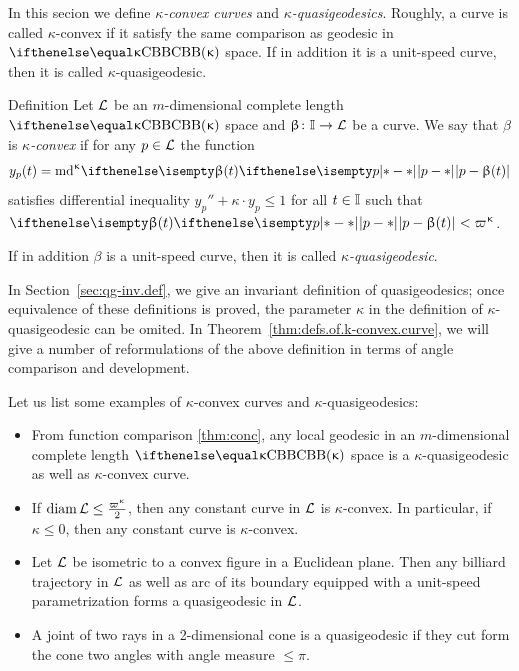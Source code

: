 In this secion we define \emph{$\kappa$-convex curves} and \emph{$\kappa$-quasigeodesics}.
Roughly, a curve is called $\kappa$-convex if it satisfy the same comparison as geodesic in $\Alex\kappa$ space.
If in addition it is a unit-speed curve, then it is called $\kappa$-quasigeodesic.

\begin{thm}{Definition}\label{def:k-convex.curve}
Let 
$\mathcal{L}$ be an $m$-dimensional complete length $\Alex\kappa$ space
and $\beta\:\II\to \spc{L}$ be a curve.
We say that $\beta$ is \emph{$\kappa$-convex} if for any $p\in \spc{L}$ the function
\[y_p(t)=\md\kappa\dist[{{}}]{p}{\beta(t)}{}\] 
satisfies differential inequality $y_p''+\kappa\cdot  y_p\le 1$ for all $t\in\II$ such that $\dist{p}{\beta(t)}{}\z<\varpi\kappa$.

If in addition $\beta$ is a unit-speed curve, then it is called \emph{$\kappa$-quasigeodesic}.
\end{thm}


In Section~\ref{sec:qg-inv.def}, 
we give an invariant definition of quasigeodesics; 
once equivalence of these definitions is proved, the parameter $\kappa$ in the definition of $\kappa$-quasigeodesic can be omited. 
In Theorem~\ref{thm:defs.of.k-convex.curve}, 
we will give a number of reformulations of the above definition in terms of angle comparison and development.

Let us list some examples of $\kappa$-convex curves and $\kappa$-quasigeodesics:
\begin{itemize}
\item From function comparison \ref{thm:conc}, any local geodesic in an $m$-dimensional complete length $\Alex\kappa$ space is a $\kappa$-\nospace quasigeodesic as well as $\kappa$-convex curve.
\item If $\diam \spc{L}\le \tfrac{\varpi\kappa}{2}$, then any constant curve in $\mathcal{L}$ is $\kappa$-convex.
In particular, if $\kappa\le0$, then any constant curve is $\kappa$-convex.
\item 
Let $\mathcal{L}$ be isometric to a convex figure in a Euclidean plane.
Then any billiard trajectory in  $\mathcal{L}$ as well as arc of its boundary equipped with a unit-speed parametrization forms a quasigeodesic in $\mathcal{L}$.
\item A joint of two rays in a 2-dimensional cone is a quasigeodesic if they cut form the cone two angles with angle measure $\le\pi$. 
\end{itemize}

